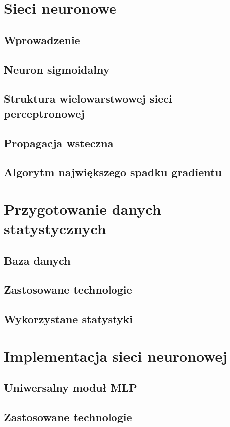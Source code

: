 \chapter{Sieci neuronowe}
\section{Wprowadzenie}
\section{Neuron sigmoidalny}
\section{Struktura wielowarstwowej sieci perceptronowej}
\section{Propagacja wsteczna}
\section{Algorytm największego spadku gradientu}

\chapter{Przygotowanie danych statystycznych}
\section{Baza danych}
\section{Zastosowane technologie}
\section{Wykorzystane statystyki}

\chapter{Implementacja sieci neuronowej}
\section{Uniwersalny moduł MLP}
\section{Zastosowane technologie}
